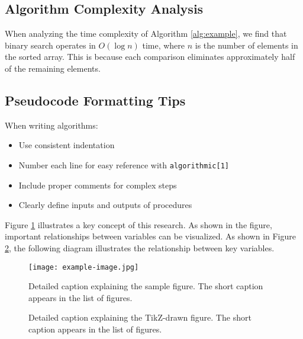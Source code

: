 \subsection{Algorithm Complexity Analysis}
When analyzing the time complexity of Algorithm \ref{alg:example}, we find that binary search operates in $O(\log n)$ time, where $n$ is the number of elements in the sorted array. This is because each comparison eliminates approximately half of the remaining elements.

\subsection{Pseudocode Formatting Tips}
When writing algorithms:
\begin{itemize}
    \item Use consistent indentation
    \item Number each line for easy reference with \texttt{algorithmic[1]}
    \item Include proper comments for complex steps
    \item Clearly define inputs and outputs of procedures
\end{itemize}

Figure \ref{fig:external_image} illustrates a key concept of this research. As shown in the figure, important relationships between variables can be visualized.
As shown in Figure \ref{fig:tikz_figure}, the following diagram illustrates the relationship between key variables.

\begin{figure}[H]
    \centering
    \texttt{[image: example-image.jpg]} %
    \caption[Short caption for sample figure]{Detailed caption explaining the sample figure. The short caption appears in the list of figures.}
    \label{fig:external_image}
\end{figure}

\begin{figure}[H]
    \centering
    \caption[Short caption for TikZ figure]{Detailed caption explaining the TikZ-drawn figure. The short caption appears in the list of figures.}
    \label{fig:tikz_figure}
\end{figure}


